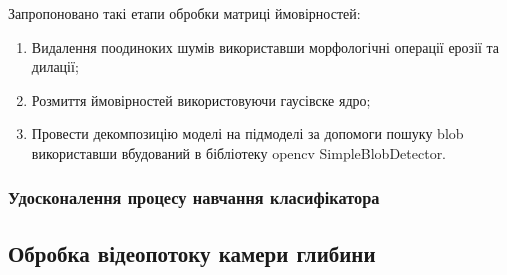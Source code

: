 Запропоновано такі етапи обробки матриці ймовірностей:
\begin{enumerate}
	\item Видалення поодиноких шумів використавши морфологічні операції ерозії та дилації;
	\item Розмиття ймовірностей використовуючи гаусівске ядро;
	\item Провести декомпозицію моделі на підмоделі за допомоги пошуку blob використавши вбудований в бібліотеку opencv SimpleBlobDetector.
\end{enumerate}

\subsubsection{Удосконалення процесу навчання класифікатора}

\subsection{Обробка відеопотоку камери глибини}